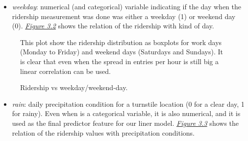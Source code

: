 \documentclass[a4paper,12pt,english]{sphinxmanual}
\begin{document}
\begin{itemize}
\item {} 
\emph{weekday}: numerical (and categorical) variable indicating if the day
when the ridership measurement was done was either a weekday (1) or weekend
day (0). {\hyperref[section2:figure32]{\emph{Figure 3.2}}}
shows the relation of the ridership with kind of day.

\end{itemize}
\begin{figure}[htbp]
\centering
\capstart

\caption{Ridership vs weekday/weekend-day.}{\small 
This plot show the ridership distribution as boxplots for work days (Monday to
Friday) and weekend days (Saturdays and Sundays). It is clear that even
when the spread in entries per hour is still big a linear correlation can
be used.
}\label{section2:figure32}\end{figure}
\begin{itemize}
\item {} 
\emph{rain}: daily precipitation condition for a turnstile location (0 for a clear
day, 1 for rainy). Even when is a categorical variable, it is also numerical,
and it is used as the final predictor feature for our liner model.
{\hyperref[section2:figure33]{\emph{Figure 3.3}}} shows the relation of the ridership values with
precipitation conditions.

\end{itemize}
\end{document}
